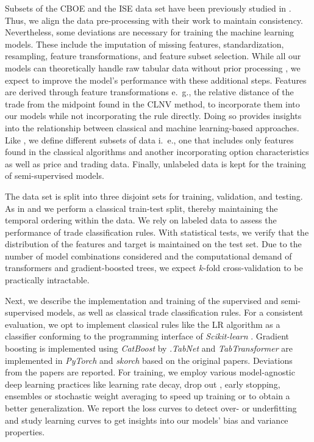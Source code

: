 Subsets of the \gls{CBOE} and the \gls{ISE} data set have been previously studied in \textcite{grauerOptionTradeClassification2022}. Thus, we align the data pre-processing with their work to maintain consistency. Nevertheless, some deviations are necessary for training the machine learning models. These include the imputation of missing features, standardization, resampling, feature transformations, and feature subset selection. While all our models can theoretically handle raw tabular data without prior processing \autocites{arikTabNetAttentiveInterpretable2020}{prokhorenkovaCatBoostUnbiasedBoosting2018}{huangTabTransformerTabularData2020}, we expect to improve the model's performance with these additional steps. Features are derived through feature transformations e.~g., the relative distance of the trade from the midpoint found in the \gls{CLNV} method, to incorporate them into our models while not incorporating the rule directly. Doing so provides insights into the relationship between classical and machine learning-based approaches. Like \textcite{ronenMachineLearningTrade2022}, we define different subsets of data i.~e., one that includes only features found in the classical algorithms and another incorporating option characteristics as well as price and trading data. Finally, unlabeled data is kept for the training of semi-supervised models.

The data set is split into three disjoint sets for training, validation, and testing. As in \textcite{ellisAccuracyTradeClassification2000} and \textcite{ronenMachineLearningTrade2022} we perform a classical train-test split, thereby maintaining the temporal ordering within the data. We rely on labeled data to assess the performance of trade classification rules. With statistical tests, we verify that the distribution of the features and target is maintained on the test set. Due to the number of model combinations considered and the computational demand of transformers and gradient-boosted trees, we expect $k$-fold cross-validation to be practically intractable.

Next, we describe the implementation and training of the supervised and semi-supervised models, as well as classical trade classification rules. 
For a consistent evaluation, we opt to implement classical rules like the \gls{LR} algorithm as a classifier conforming to the programming interface of \textit{Scikit-learn} \autocite{pedregosaScikitlearnMachineLearning2018}.
Gradient boosting is implemented using \textit{CatBoost} by \textcite{prokhorenkovaCatBoostUnbiasedBoosting2018}.\textit{TabNet} and \textit{TabTransformer} are implemented in \textit{PyTorch} \autocite{paszkePyTorchImperativeStyle2019} and \textit{skorch} based on the original papers. Deviations from the papers are reported.
For training, we employ various model-agnostic deep learning practices like learning rate decay, drop out \autocite{hintonImprovingNeuralNetworks2012}, early stopping, ensembles \autocite{huangSnapshotEnsemblesTrain2017} or stochastic weight averaging \autocite{izmailovAveragingWeightsLeads2019} to speed up training or to obtain a better generalization. We report the loss curves to detect over- or underfitting and study learning curves to get insights into our models' bias and variance properties.  

